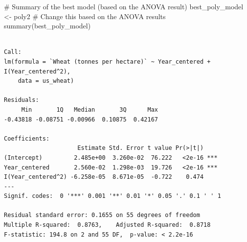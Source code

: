 \documentclass[
  letterpaper,
]{book}
\newenvironment{Shaded}{\begin{snugshade}}{\end{snugshade}}
\newcommand{\CommentTok}[1]{\textcolor[rgb]{0.37,0.37,0.37}{#1}}
\newcommand{\FunctionTok}[1]{\textcolor[rgb]{0.28,0.35,0.67}{#1}}
\newcommand{\NormalTok}[1]{\textcolor[rgb]{0.00,0.23,0.31}{#1}}
\newcommand{\OtherTok}[1]{\textcolor[rgb]{0.00,0.23,0.31}{#1}}
\begin{document}
\begin{Shaded}
\begin{Highlighting}[]
\CommentTok{\# Summary of the best model (based on the ANOVA result)}
\NormalTok{best\_poly\_model }\OtherTok{\textless{}{-}}\NormalTok{ poly2  }\CommentTok{\# Change this based on the ANOVA results}
\FunctionTok{summary}\NormalTok{(best\_poly\_model)}
\end{Highlighting}
\end{Shaded}

\begin{verbatim}

Call:
lm(formula = `Wheat (tonnes per hectare)` ~ Year_centered + I(Year_centered^2), 
    data = us_wheat)

Residuals:
     Min       1Q   Median       3Q      Max 
-0.43818 -0.08751 -0.00966  0.10875  0.42167 

Coefficients:
                     Estimate Std. Error t value Pr(>|t|)    
(Intercept)         2.485e+00  3.260e-02  76.222   <2e-16 ***
Year_centered       2.560e-02  1.298e-03  19.726   <2e-16 ***
I(Year_centered^2) -6.258e-05  8.671e-05  -0.722    0.474    
---
Signif. codes:  0 '***' 0.001 '**' 0.01 '*' 0.05 '.' 0.1 ' ' 1

Residual standard error: 0.1655 on 55 degrees of freedom
Multiple R-squared:  0.8763,    Adjusted R-squared:  0.8718 
F-statistic: 194.8 on 2 and 55 DF,  p-value: < 2.2e-16
\end{verbatim}
\end{document}
